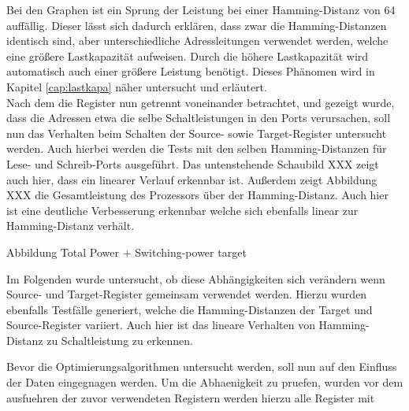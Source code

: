 Bei den Graphen ist ein Sprung der Leistung bei einer Hamming-Distanz von 64 auffällig. Dieser lässt sich dadurch erklären, dass zwar die Hamming-Distanzen identisch sind, aber unterschiedliche Adressleitungen verwendet werden, welche eine größere Lastkapazität aufweisen. Durch die höhere Lastkapazität wird automatisch auch einer größere Leistung benötigt. Dieses Phänomen wird in Kapitel \ref{cap:lastkapa} näher untersucht und erläutert.\\

Nach dem die Register nun getrennt voneinander betrachtet, und gezeigt wurde, dass die Adressen etwa die selbe Schaltleistungen in den Ports verursachen, soll nun das Verhalten beim Schalten der Source- sowie Target-Register untersucht werden. Auch hierbei werden die Tests mit den selben Hamming-Distanzen für Lese- und Schreib-Ports ausgeführt. Das untenstehende Schaubild XXX zeigt auch hier, dass ein linearer Verlauf erkennbar ist.
Außerdem zeigt Abbildung XXX die Gesamtleistung des Prozessors über der Hamming-Distanz. Auch hier ist eine deutliche Verbesserung erkennbar welche sich ebenfalls linear zur Hamming-Distanz verhält.

Abbildung Total Power + Switching-power target


Im Folgenden wurde untersucht, ob diese Abhängigkeiten sich verändern wenn Source- und Target-Register gemeinsam verwendet werden. Hierzu wurden ebenfalls Testfälle generiert, welche die Hamming-Distanzen der Target und Source-Register variiert. Auch hier ist das lineare Verhalten von Hamming-Distanz zu Schaltleistung zu erkennen.

Bevor die Optimierungsalgorithmen untersucht werden, soll nun auf den Einfluss der Daten eingegnagen werden. Um die Abhaenigkeit zu pruefen, wurden vor dem ausfuehren der zuvor verwendeten Registern werden hierzu alle Register mit 

